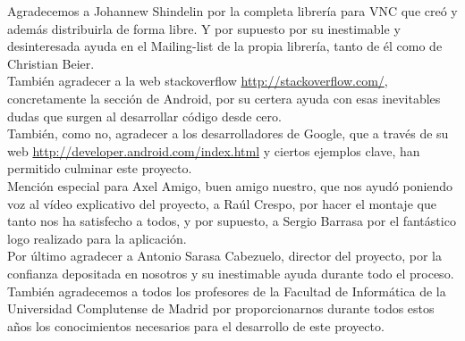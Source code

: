 Agradecemos a Johannew Shindelin por la completa librer\'ia para VNC que cre\'o y adem\'as distribuirla de forma libre. Y por supuesto por su inestimable y desinteresada ayuda en el Mailing-list de la propia librer\'ia, tanto de \'el como de Christian Beier.\\

Tambi\'en agradecer a la web stackoverflow \url{http://stackoverflow.com/}, concretamente la secci\'on de Android, por su certera ayuda con esas inevitables dudas que surgen al desarrollar c\'odigo desde cero.\\

Tambi\'en, como no, agradecer a los desarrolladores de Google, que a trav\'es de su web \url{http://developer.android.com/index.html} y ciertos ejemplos clave, han permitido culminar este proyecto.\\

Menci\'on especial para Axel Amigo, buen amigo nuestro, que nos ayud\'o poniendo voz al v\'ideo explicativo del proyecto, a Ra\'ul Crespo, por hacer el montaje que tanto nos ha satisfecho a todos, y por supuesto, a Sergio Barrasa por el fant\'astico logo realizado para la aplicaci\'on.\\

Por \'ultimo agradecer a Antonio Sarasa Cabezuelo, director del proyecto, por la confianza depositada en nosotros y su inestimable ayuda durante todo el proceso. Tambi\'en agradecemos a todos los profesores de la Facultad de Inform\'atica de la Universidad Complutense de Madrid por proporcionarnos durante todos estos años los conocimientos necesarios para el desarrollo de este proyecto.